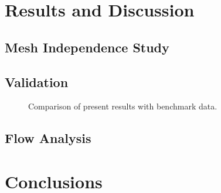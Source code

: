 \documentclass[preprint,12pt]{elsarticle}
\begin{document}
\section{Results and Discussion}
\label{sec:results}

\subsection{Mesh Independence Study}


\subsection{Validation}


\begin{figure}[htbp]
  \centering
  \caption{Comparison of present results with benchmark data.}
  \label{fig:validation}
\end{figure}

\subsection{Flow Analysis}


\section{Conclusions}
\label{sec:conclusions}




\end{document}

